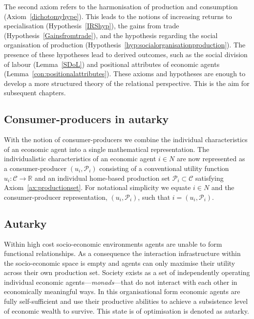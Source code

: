 The second axiom refers to the harmonisation of production and consumption (Axiom~\ref{dichotomyhype}). This leads to the notions of increasing returns to specialisation (Hypothesis~\ref{IRShyp}), the gains from trade (Hypothesis~\ref{Gainsfromtrade}), and the hypothesis regarding the social organisation of production (Hypothesis~\ref{hyp:socialorganisationproduction}). The presence of these hypotheses lead to derived outcomes, such as the social division of labour (Lemma~\ref{SDoL}) and positional attributes of economic agents (Lemma~\ref{con:positionalattributes}). These axioms and hypotheses are enough to develop a more structured theory of the relational perspective. This is the aim for subsequent chapters.

\begin{subappendices}

\section{Consumer-producers in autarky}
\label{App:autarky}

With the notion of consumer-producers we combine the individual characteristics of an economic agent into a single mathematical representation. The individualistic characteristics of an economic agent $i \in N$ are now represented as a consumer-producer $(u_{i}, \mathcal{P}_{i})$ consisting of a conventional utility function $u_{i} \colon \mathcal{C} \rightarrow \mathbb{R}$ and an individual home-based production set $\mathcal{P}_{i} \subset \mathcal{C}$ satisfying Axiom~\ref{ax:productionset}. For notational simplicity we equate $i \in N$ and the consumer-producer representation, $(u_{i}, \mathcal{P}_{i})$, such that $i = (u_{i}, \mathcal{P}_{i})$.

\subsection{Autarky}

Within high cost socio-economic environments agents are unable to form functional relationships. As a consequence the interaction infrastructure within the socio-economic space is empty and agents can only maximise their utility across their own production set. Society exists as a set of independently operating individual economic agents---\emph{monads}---that do not interact with each other in economically meaningful ways. In this organisational form economic agents are fully self-sufficient and use their productive abilities to achieve a subsistence level of economic wealth to survive. This state is of optimisation is denoted as autarky.


\end{subappendices}
